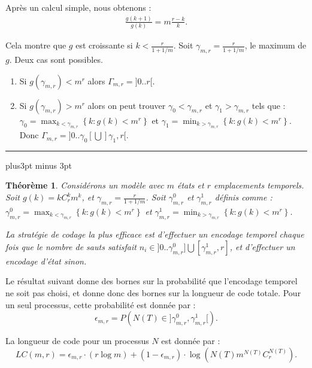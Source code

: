 \documentclass[11pt,a4paper]{article}
\newtheorem{thm}{Théorème}[section]
\def\endproof{\hfill\hspace{-6pt}\rule[-4pt]{6pt}{6pt}
	\vskip8pt plus3pt minus 3pt}
\begin{document}
	Après un calcul simple, nous obtenons :
	\begin{eqnarray}
		\frac{g(k+1)}{g(k)} = m \frac{r-k}{k}.
	\end{eqnarray}
	
	Cela montre que $g$ est croissante si $k < \frac{r}{1 + 1/m}$. Soit $\gamma_{m,r} = \frac{r}{1 + 1/m}$, le maximum de $g$. Deux cas sont possibles.
	\begin{enumerate}
		\item[1)] Si $g(\gamma_{m,r}) < m^r$ alors $\Gamma_{m,r}= ]0..r[$.
		\item[2)] Si $g(\gamma_{m,r}) > m^r$ alors on peut trouver $\gamma_0 < \gamma_{m,r}$ et $\gamma_1 > \gamma_{m,r}$ tels que :
		$\gamma_0 = \max_{k < \gamma_{m,r}} \left \{ k : g(k) < m^r  \right \}$ et $\gamma_1 = \min_{k > \gamma_{m,r}} \left \{ k : g(k) < m^r \right \}$. Donc $\Gamma_{m,r}= ]0..\gamma_0[ \bigcup ]\gamma_1,r[$.
	\end{enumerate}
	\endproof
	
	\begin{thm}
		\label{MainProp}
		Considérons un modèle avec $m$ états et $r$ emplacements temporels. Soit $g(k)=kC_r^km^k$, et $\gamma_{m,r} = \frac{r}{1 + 1/m}$. Soit $\gamma_{m,r}^0$ et $\gamma_{m,r}^1$ définis comme :
		$\gamma_{m,r}^0 = \max_{k < \gamma_{m,r}} \left \{ k : g(k) < m^r  \right \}$ et $\gamma_{m,r}^1 = \min_{k > \gamma_{m,r}} \left \{ k : g(k) < m^r \right \}$.
		
		La stratégie de codage la plus efficace est d'effectuer un encodage temporel chaque fois que le nombre de sauts satisfait $n_i \in ]0..\gamma_{m,r}^0] \bigcup [\gamma_{m,r}^1,r]$, et d'effectuer un encodage d'état sinon.
	\end{thm}
	
	Le résultat suivant donne des bornes sur la probabilité que l'encodage temporel ne soit pas choisi, et donne donc des bornes sur la longueur de code totale. Pour un seul processus, cette probabilité est donnée par :
	\begin{equation}
		\epsilon_{m,r} = P \left ( N(T) \in ]\gamma_{m,r}^0,\gamma_{m,r}^1[  \right ).
	\end{equation}
	
	La longueur de code pour un processus $N$ est donnée par :
	\begin{equation}
		LC(m,r) = \epsilon_{m,r} \cdot ( r\log m) + (1 - \epsilon_{m,r} ) \cdot \log \left ( N(T)m^{N(T)}C_r^{N(T)} \right ).
	\end{equation}
	
\end{document}
